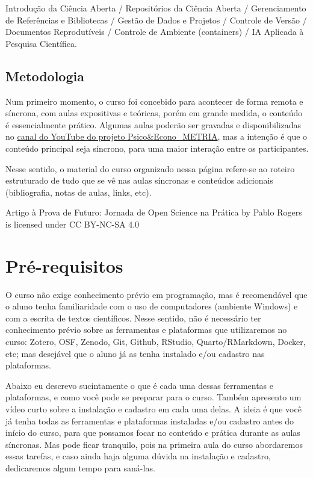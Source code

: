 \documentclass[
  a4paper,
]{article}
\begin{document}

Introdução da Ciência Aberta / Repositórios da Ciência Aberta /
Gerenciamento de Referências e Bibliotecas / Gestão de Dados e Projetos
/ Controle de Versão / Documentos Reprodutíveis / Controle de Ambiente
(containers) / IA Aplicada à Pesquisa Científica.

\subsection*{Metodologia}\label{sec-method}


Num primeiro momento, o curso foi concebido para acontecer de forma
remota e síncrona, com aulas expositivas e teóricas, porém em grande
medida, o conteúdo é essencialmente prático. Algumas aulas poderão ser
gravadas e disponibilizadas no
\href{https://www.youtube.com/c/PsicoEconoMETRIA}{canal do YouTube do
projeto Psico\&Econo\_METRIA}, mas a intenção é que o conteúdo principal
seja síncrono, para uma maior interação entre os participantes.

Nesse sentido, o material do curso organizado nessa página refere-se ao
roteiro estruturado de tudo que se vê nas aulas síncronas e conteúdos
adicionais (bibliografia, notas de aulas, links, etc).

Artigo à Prova de Futuro: Jornada de Open Science na Prática by Pablo
Rogers is licensed under CC BY-NC-SA 4.0


\section*{Pré-requisitos 📇}\label{sec-prework}


O curso não exige conhecimento prévio em programação, mas é recomendável
que o aluno tenha familiaridade com o uso de computadores (ambiente
Windows) e com a escrita de textos científicos. Nesse sentido, não é
necessário ter conhecimento prévio sobre as ferramentas e plataformas
que utilizaremos no curso: Zotero, OSF, Zenodo, Git, Github, RStudio,
Quarto/RMarkdown, Docker, etc; mas desejável que o aluno já as tenha
instalado e/ou cadastro nas plataformas.

Abaixo eu descrevo sucintamente o que é cada uma dessas ferramentas e
plataformas, e como você pode se preparar para o curso. Também apresento
um vídeo curto sobre a instalação e cadastro em cada uma delas. A ideia
é que você já tenha todas as ferramentas e plataformas instaladas e/ou
cadastro antes do início do curso, para que possamos focar no conteúdo e
prática durante as aulas síncronas. Mas pode ficar tranquilo, pois na
primeira aula do curso abordaremos essas tarefas, e caso ainda haja
alguma dúvida na instalação e cadastro, dedicaremos algum tempo para
saná-las.
\end{document}
